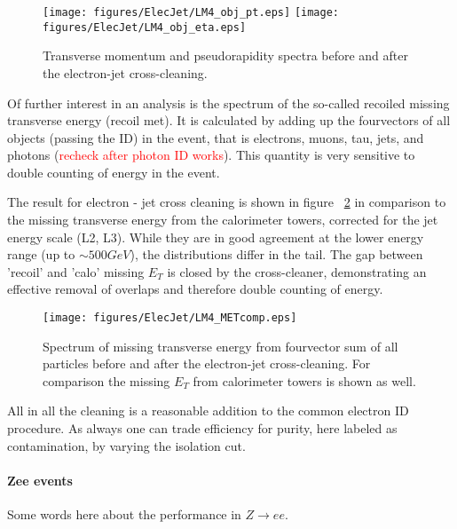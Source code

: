 \documentclass{cmspaper}
\begin{document}
\begin{figure}[hb]
\begin{center}
    \texttt{[image: figures/ElecJet/LM4\_obj\_pt.eps]}
    \texttt{[image: figures/ElecJet/LM4\_obj\_eta.eps]}
    \caption{Transverse momentum and pseudorapidity spectra before
    and after the electron-jet cross-cleaning.}
\label{fig:objSpectra_ElecJet}
\end{center}
\end{figure}

Of further interest in an analysis is the spectrum of the so-called recoiled
missing transverse energy (recoil met). It is calculated by adding up the
fourvectors of all objects (passing the ID) in the event, that is electrons,
muons, tau, jets, and photons (\textcolor{red}{recheck after photon ID works}).
This quantity is very sensitive to double counting of energy in the event.

The result for electron - jet cross cleaning is shown in figure
~\ref{fig:met_ElecJet} in comparison to the missing transverse energy from the
calorimeter towers, corrected for the jet energy scale (L2, L3). While they are
in good agreement at the lower energy range (up to \(\sim 500 GeV\)), the
distributions differ in the tail. The gap between 'recoil' and 'calo' missing
$E_T$ is closed by the cross-cleaner, demonstrating an effective removal of
overlaps and therefore double counting of energy.

\begin{figure}[hb]
\begin{center}
    \texttt{[image: figures/ElecJet/LM4\_METcomp.eps]}
    \caption{Spectrum of missing transverse energy from fourvector sum of all
    particles before and after the electron-jet cross-cleaning. For comparison
    the missing $E_T$ from calorimeter towers is shown as well.}
\label{fig:met_ElecJet}
\end{center}
\end{figure}
All in all the cleaning is a reasonable addition to the
common electron ID procedure. As always one can trade efficiency for purity,
here labeled as contamination, by varying the isolation cut.

\paragraph{Zee events}
Some words here about the performance in $Z\rightarrow ee$.
\end{document}

